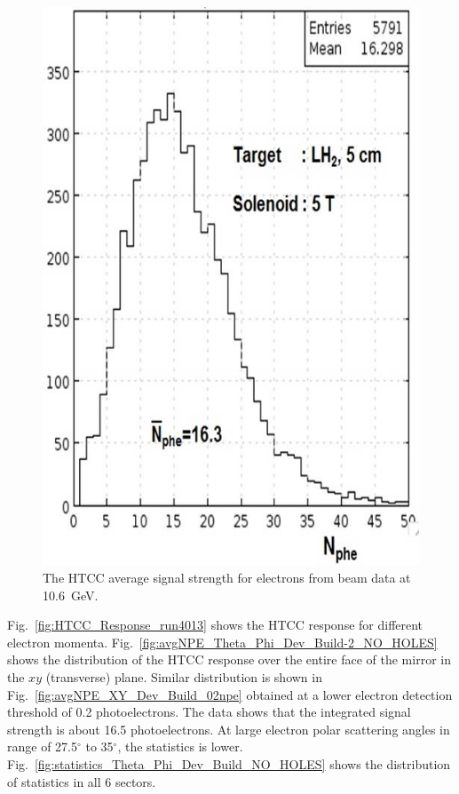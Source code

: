 \begin{figure}[!ht]
    \centering
    \includegraphics[width=1.0\linewidth,trim={0.0cm 0.0cm 0.0cm 0.0cm},clip]{images/Average_HTCC_Signal.jpg}
    \caption{The HTCC average signal strength for electrons from beam data at 10.6~GeV.}
    \label{fig:Average_HTCC_Signal}
\end{figure}

Fig.~\ref{fig:HTCC_Response_run4013} shows the HTCC response for different electron momenta.
Fig.~\ref{fig:avgNPE_Theta_Phi_Dev_Build-2_NO_HOLES}  shows the distribution of the HTCC response over
the entire face of the mirror in the $xy$ (transverse) plane. Similar distribution is shown in
Fig.~\ref{fig:avgNPE_XY_Dev_Build_02npe} obtained at a lower electron detection threshold of 0.2 photoelectrons.
The data shows that the integrated signal strength is about 16.5 photoelectrons. At large electron polar scattering
angles in range of 27.5$^\circ$ to 35$^\circ$, the statistics is lower.
Fig.~\ref{fig:statistics_Theta_Phi_Dev_Build_NO_HOLES} shows the distribution of statistics in all 6 sectors. 


